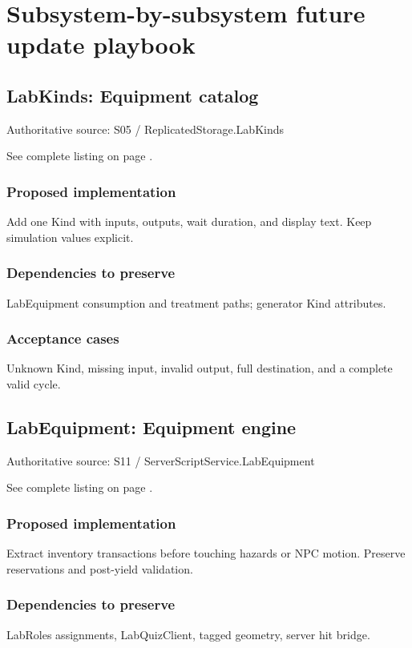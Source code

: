 \chapter{Subsystem-by-subsystem future update playbook}
\section{LabKinds: Equipment catalog}
Authoritative source: S05 /\allowbreak{} ReplicatedStorage.\allowbreak{}LabKinds

See complete listing on page \pageref{src:S05}.

\subsection{Proposed implementation}
Add one Kind with inputs, outputs, wait duration, and display text.\allowbreak{} Keep simulation values explicit.\allowbreak{}

\subsection{Dependencies to preserve}
LabEquipment consumption and treatment paths; generator Kind attributes.\allowbreak{}

\subsection{Acceptance cases}
Unknown Kind, missing input, invalid output, full destination, and a complete valid cycle.\allowbreak{}

\section{LabEquipment: Equipment engine}
Authoritative source: S11 /\allowbreak{} ServerScriptService.\allowbreak{}LabEquipment

See complete listing on page \pageref{src:S11}.

\subsection{Proposed implementation}
Extract inventory transactions before touching hazards or NPC motion.\allowbreak{} Preserve reservations and post-yield validation.\allowbreak{}

\subsection{Dependencies to preserve}
LabRoles assignments, LabQuizClient, tagged geometry, server hit bridge.\allowbreak{}

